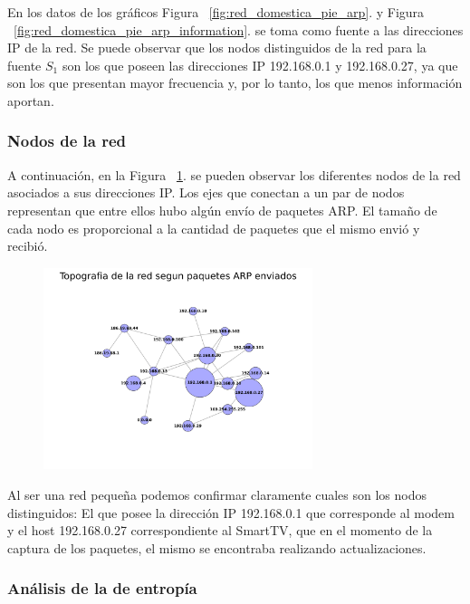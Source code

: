 En los datos de los gráficos Figura ~\ref{fig:red_domestica_pie_arp}. y Figura ~\ref{fig:red_domestica_pie_arp_information}. se toma como fuente a las direcciones IP de la red.
Se puede observar que los nodos distinguidos de la red para la fuente $S_1$ son los que poseen las direcciones IP 192.168.0.1 y 192.168.0.27, ya que son los que presentan mayor frecuencia y, por lo tanto, los que menos información aportan.

\FloatBarrier

\subsubsection{Nodos de la red}

A continuación, en la Figura ~\ref{fig:red_domestica_network}. se pueden observar los diferentes nodos de la red asociados a sus direcciones IP. Los ejes que conectan a un par de nodos representan que entre ellos hubo algún envío de paquetes ARP. El tamaño de cada nodo es proporcional a la cantidad de paquetes que el mismo envió y recibió.

\begin{figure}[ht!]
  \centering
   \includegraphics[width=0.7\textwidth]{graficos/red_domestica_network.png}
  \caption{}
  \label{fig:red_domestica_network}
\end{figure}

Al ser una red pequeña podemos confirmar claramente cuales son los nodos distinguidos: El que posee la dirección IP 192.168.0.1 que corresponde al modem y el host 192.168.0.27 correspondiente al SmartTV, que en el momento de la captura de los paquetes, el mismo se encontraba realizando actualizaciones.

\FloatBarrier

\subsubsection{Análisis de la de entropía}

